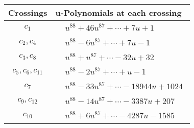 \documentclass[1p]{elsarticle_modified}
\theoremstyle{definition}
\begin{document}
\begin{tabular}{m{50pt}|m{274pt}}
Crossings & \hspace{64pt}u-Polynomials at each crossing \\
\hline $$\begin{aligned}c_{1}\end{aligned}$$&$\begin{aligned}
&u^{88}+46 u^{87}+\cdots+7 u+1
\end{aligned}$\\
\hline $$\begin{aligned}c_{2},c_{4}\end{aligned}$$&$\begin{aligned}
&u^{88}-6 u^{87}+\cdots+7 u-1
\end{aligned}$\\
\hline $$\begin{aligned}c_{3},c_{8}\end{aligned}$$&$\begin{aligned}
&u^{88}+u^{87}+\cdots-32 u+32
\end{aligned}$\\
\hline $$\begin{aligned}c_{5},c_{6},c_{11}\end{aligned}$$&$\begin{aligned}
&u^{88}-2 u^{87}+\cdots+u-1
\end{aligned}$\\
\hline $$\begin{aligned}c_{7}\end{aligned}$$&$\begin{aligned}
&u^{88}-33 u^{87}+\cdots-18944 u+1024
\end{aligned}$\\
\hline $$\begin{aligned}c_{9},c_{12}\end{aligned}$$&$\begin{aligned}
&u^{88}-14 u^{87}+\cdots-3387 u+207
\end{aligned}$\\
\hline $$\begin{aligned}c_{10}\end{aligned}$$&$\begin{aligned}
&u^{88}+6 u^{87}+\cdots-4287 u-1585
\end{aligned}$\\
\hline
\end{tabular}\\~\\
\newpage\renewcommand{\arraystretch}{1}
\end{document}
